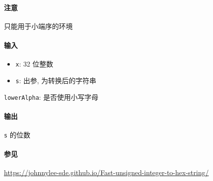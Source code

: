 \paragraph{注意}

只能用于小端序的环境

\paragraph{输入}

\begin{itemize}
    \item \verb|x|: 32 位整数
    \item \verb|s|: 出参, 为转换后的字符串
\end{itemize}

\verb|lowerAlpha|: 是否使用小写字母

\paragraph{输出}

\verb|s| 的位数

\paragraph{参见}

\url{https://johnnylee-sde.github.io/Fast-unsigned-integer-to-hex-string/}

